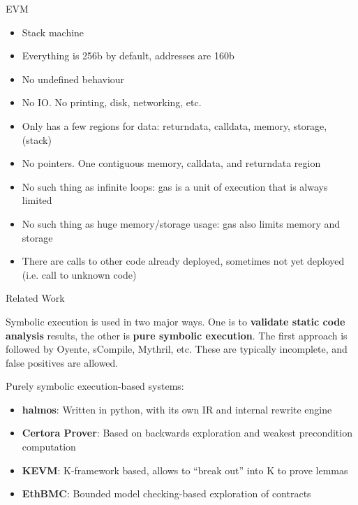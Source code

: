 \documentclass[aspectratio=169]{beamer}
\begin{document}
\begin{frame}[fragile=singleslide]{EVM}
\begin{itemize}
    \item Stack machine
    \item Everything is 256b by default, addresses are 160b
    \item No undefined behaviour
    \item No IO. No printing, disk, networking, etc.
    \item Only has a few regions for data: returndata, calldata, memory, storage, (stack)
    \item No pointers. One contiguous memory, calldata, and returndata region
    \item No such thing as infinite loops: gas is a unit of execution that is always limited
    \item No such thing as huge memory/storage usage: gas also limits memory and storage
    \item There are calls to other code already deployed, sometimes not yet deployed (i.e. call to unknown code)
\end{itemize}
\end{frame}


\begin{frame}{Related Work}

Symbolic execution is used in two major ways. One is to \textbf{validate static
code analysis} results, the other is \textbf{pure symbolic execution}. The
first approach is followed by Oyente, sCompile, Mythril, etc. These are
typically incomplete, and false positives are allowed.

\bigskip

Purely symbolic execution-based systems:
\begin{itemize}
\item \textbf{halmos}: Written in python, with its own IR and internal rewrite engine
\item \textbf{Certora Prover}: Based on backwards exploration and weakest precondition computation
\item \textbf{KEVM}: K-framework based, allows to ``break out'' into K to prove lemmas
\item \textbf{EthBMC}: Bounded model checking-based exploration of contracts
\end{itemize}
\end{frame}
\end{document}
